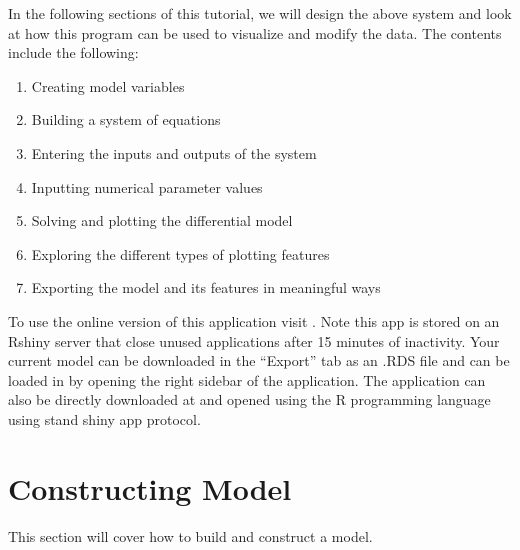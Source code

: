 \documentclass[letterpaper,10pt,english]{sphinxmanual}
\begin{document}
\sphinxAtStartPar
In the following sections of this tutorial, we will design the above system and
look at how this program can be used to visualize and modify the data.
The contents include the following:
\begin{enumerate}
%
\item {} 
\sphinxAtStartPar
Creating model variables

\item {} 
\sphinxAtStartPar
Building a system of equations

\item {} 
\sphinxAtStartPar
Entering the inputs and outputs of the system

\item {} 
\sphinxAtStartPar
Inputting numerical parameter values

\item {} 
\sphinxAtStartPar
Solving and plotting the differential model

\item {} 
\sphinxAtStartPar
Exploring the different types of plotting features

\item {} 
\sphinxAtStartPar
Exporting the model and its features in meaningful ways

\end{enumerate}

\sphinxAtStartPar
To use the online version of this application visit
.  Note this app is stored on an Rshiny server
that close unused applications after 15 minutes of inactivity. Your current
model can be downloaded in the “Export” tab as an .RDS file and can be loaded
in by opening the right sidebar of the application. The application can also
be directly downloaded at
 and opened using the
R programming language using stand shiny app protocol.


\section{Constructing Model}
\label{\detokenize{pages/tutorial_sc/1_construct_model:constructing-model}}\label{\detokenize{pages/tutorial_sc/1_construct_model::doc}}
\sphinxAtStartPar
This section will cover how to build and construct a model.
\end{document}
